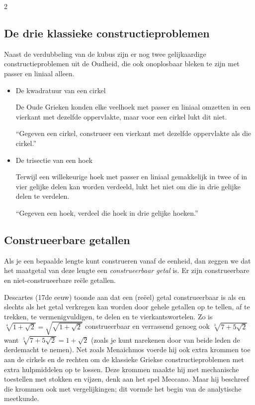 \begin{multicols}{2}

\subsection*{De drie klassieke constructieproblemen}

Naast de verdubbeling van de kubus zijn er nog twee gelijkaardige constructieproblemen uit de Oudheid, die ook onoplosbaar bleken te zijn met passer en liniaal alleen.

\begin{itemize}
	\item De kwadratuur van een cirkel
	
	De Oude Grieken konden elke veelhoek met passer en liniaal omzetten in een vierkant met dezelfde oppervlakte, maar voor een cirkel lukt dit niet.
	
	
	``Gegeven een cirkel, construeer een vierkant met dezelfde oppervlakte als die cirkel.'' 
	
	\item De trisectie van een hoek
	
	Terwijl een willekeurige hoek met passer en liniaal gemakkelijk in twee of in vier gelijke delen kan worden verdeeld, lukt het niet om die in drie gelijke delen te verdelen.
	
	
	``Gegeven een hoek, verdeel die hoek in drie gelijke hoeken.''
	
	
\end{itemize}

\subsection*{Construeerbare getallen}

Als je een bepaalde lengte kunt construeren vanaf de eenheid, dan zeggen we dat het maatgetal van deze lengte een \emph{construeerbaar getal} is. Er zijn construeerbare en niet-construeerbare reële getallen. 

Descartes (17de eeuw) toonde aan dat een (reëel) getal construeerbaar is als en slechts als het getal verkregen kan worden door gehele getallen op te tellen, af te trekken, te vermenigvuldigen, te delen en te vierkantswortelen. Zo is $\sqrt[4]{1+\sqrt{2}}=\sqrt{\sqrt{1+\sqrt{2}}}$ construeerbaar en verrassend genoeg ook $\sqrt[3]{7+5\sqrt{2}}$ want $\sqrt[3]{7+5\sqrt{2}}=1+\sqrt{2}$ (zoals je kunt narekenen door van beide leden de derdemacht te nemen). Net zoals Menaichmos voerde hij ook extra krommen toe aan de cirkels en de rechten om de klassieke Griekse constructieproblemen met extra hulpmiddelen op te lossen. Deze krommen maakte hij met mechanische toestellen met stokken en vijzen, denk aan het spel Meccano. Maar hij beschreef die krommen ook met vergelijkingen; dit vormde het begin van de analytische meetkunde.	
	

\end{multicols}
